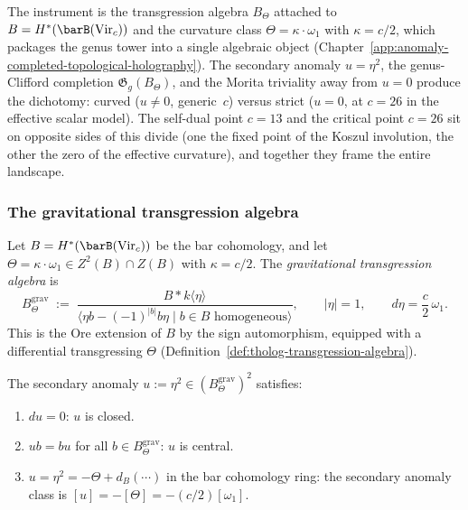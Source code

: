 The instrument is the transgression algebra $B_\Theta$ attached to
$B = H^*(\barB(\mathrm{Vir}_c))$ and the curvature class
$\Theta = \kappa \cdot \omega_1$ with $\kappa = c/2$, which
packages the genus tower into a single algebraic object
(Chapter~\ref{app:anomaly-completed-topological-holography}).
The secondary anomaly $u = \eta^2$, the genus-Clifford completion
$\mathfrak{G}_g(B_\Theta)$, and the Morita triviality away from
$u = 0$ produce the dichotomy: curved ($u \ne 0$, generic~$c$)
versus strict ($u = 0$, at $c = 26$ in the effective scalar model). The self-dual point $c = 13$
and the critical point $c = 26$ sit on opposite sides of this
divide (one the fixed point of the Koszul involution, the
other the zero of the effective curvature), and together they
frame the entire landscape.

\subsubsection*{The gravitational transgression algebra}

\begin{definition}
\label{def:gravity-transgression}
Let $B = H^*(\barB(\mathrm{Vir}_c))$ be the bar cohomology, and
let $\Theta = \kappa \cdot \omega_1 \in Z^2(B) \cap Z(B)$
with $\kappa = c/2$. The \emph{gravitational transgression
algebra} is
\[
B_\Theta^{\mathrm{grav}}
\;:=\;
\frac{B * k\langle \eta \rangle}
{\langle \eta b - (-1)^{|b|}b\eta
 \mid b \in B\text{ homogeneous}\rangle},
\qquad
|\eta| = 1,
\qquad
d\eta = \frac{c}{2}\,\omega_1.
\]
This is the Ore extension of $B$ by the sign automorphism,
equipped with a differential transgressing $\Theta$
\textup{(}Definition~\textup{\ref{def:tholog-transgression-algebra}}\textup{)}.
\end{definition}

\begin{proposition}
\label{prop:gravity-u-closed-central}
The secondary anomaly $u := \eta^2 \in (B_\Theta^{\mathrm{grav}})^2$
satisfies:
\begin{enumerate}[label=\textup{(\roman*)}]
\item $du = 0$: $u$ is closed.
\item $ub = bu$ for all $b \in B_\Theta^{\mathrm{grav}}$: $u$
 is central.
\item $u = \eta^2 = -\Theta + d_B(\cdots)$ in the bar cohomology
 ring: the secondary anomaly class is $[u] = -[\Theta]
 = -(c/2)[\omega_1]$.
\end{enumerate}
\end{proposition}

